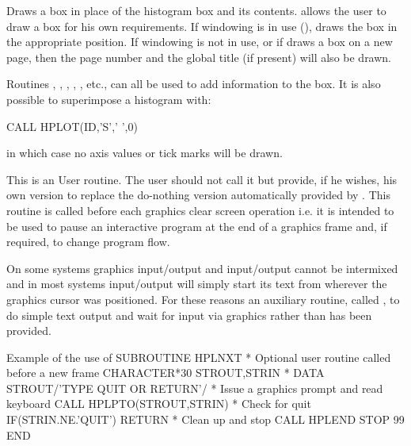 \Action
Draws a box in place of the histogram box and its contents.
\Remark
{} allows the user to draw a box for his own requirements. If 
windowing is in use (),  draws the box in the 
appropriate position. If windowing is not in use, or if  draws a 
box on a new page, then the page number and the global title (if present) will
also be drawn.

Routines , , , ,
, etc., can all be used to add information to the box.
It is also possible to superimpose a histogram with:
\begin{XMP}
      CALL HPLOT(ID,'S',' ',0)
\end{XMP}
in which case no axis values or tick marks will be drawn.


\Action
This is an \HPLOT{} User routine. The user should not call it but provide, if 
he wishes, his own version to replace the do-nothing version automatically 
provided by \HPLOT. This routine is called before each graphics clear screen 
operation i.e. it is intended to be used to pause an interactive program at the 
end of a graphics frame and, if required, to change program flow.

On some systems graphics input/output and \FORTRAN{} input/output cannot be 
intermixed and in most systems \FORTRAN{} input/output will simply start its 
text from wherever the graphics cursor was positioned. For these reasons an 
auxiliary \HPLOT{} routine, called , to do simple text output and 
wait for input via graphics rather than \FORTRAN{} has been provided.
\begin{XMPt}{Example of the use of }
     SUBROUTINE HPLNXT
*        Optional user routine called before a new frame
     CHARACTER*30   STROUT,STRIN
*
     DATA STROUT/'TYPE QUIT OR RETURN'/
*        Issue a graphics prompt and read keyboard
     CALL HPLPTO(STROUT,STRIN)
*        Check for quit
     IF(STRIN.NE.'QUIT') RETURN
*        Clean up and stop
     CALL HPLEND
     STOP 99
     END
\end{XMPt}

\newpage


